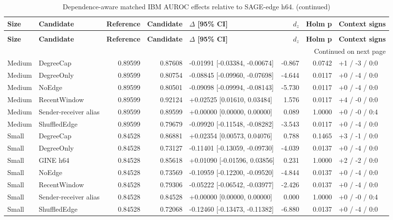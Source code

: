 \begingroup
\footnotesize
\setlength{\tabcolsep}{3pt}
\renewcommand{\arraystretch}{1.10}
\begin{longtable}{@{}p{} p{} r r p{} r r p{}@{}}
\caption{Dependence-aware matched IBM AUROC effects relative to SAGE-edge h64.}\label{tab:s-ibm-effect-auroc}\\
\toprule
\textbf{Size} & \textbf{Candidate} & \textbf{Reference} & \textbf{Candidate} & \textbf{$\Delta$ [95\% CI]} & \textbf{$d_z$} & \textbf{Holm p} & \textbf{Context signs} \\
\midrule
\endfirsthead
\caption[]{Dependence-aware matched IBM AUROC effects relative to SAGE-edge h64. (continued)}\\
\toprule
\textbf{Size} & \textbf{Candidate} & \textbf{Reference} & \textbf{Candidate} & \textbf{$\Delta$ [95\% CI]} & \textbf{$d_z$} & \textbf{Holm p} & \textbf{Context signs} \\
\midrule
\endhead
\midrule
\multicolumn{8}{r}{\footnotesize Continued on next page}\\
\endfoot
\bottomrule
\endlastfoot
Medium & DegreeCap & 0.89599 & 0.87608 & -0.01991 [-0.03384, -0.00674] & -0.867 & 0.0742 & +1 / -3 / 0:0 \\
Medium & DegreeOnly & 0.89599 & 0.80754 & -0.08845 [-0.09960, -0.07698] & -4.644 & 0.0117 & +0 / -4 / 0:0 \\
Medium & NoEdge & 0.89599 & 0.80501 & -0.09098 [-0.09994, -0.08143] & -5.730 & 0.0117 & +0 / -4 / 0:0 \\
Medium & RecentWindow & 0.89599 & 0.92124 & +0.02525 [0.01610, 0.03484] & 1.576 & 0.0117 & +4 / -0 / 0:0 \\
Medium & Sender-receiver alias & 0.89599 & 0.89599 & +0.00000 [0.00000, 0.00000] & 0.089 & 1.0000 & +0 / -0 / 0:4 \\
Medium & ShuffledEdge & 0.89599 & 0.79679 & -0.09920 [-0.11548, -0.08282] & -3.543 & 0.0117 & +0 / -4 / 0:0 \\
Small & DegreeCap & 0.84528 & 0.86881 & +0.02354 [0.00573, 0.04076] & 0.788 & 0.1465 & +3 / -1 / 0:0 \\
Small & DegreeOnly & 0.84528 & 0.73127 & -0.11401 [-0.13059, -0.09730] & -4.039 & 0.0137 & +0 / -4 / 0:0 \\
Small & GINE h64 & 0.84528 & 0.85618 & +0.01090 [-0.01596, 0.03856] & 0.231 & 1.0000 & +2 / -2 / 0:0 \\
Small & NoEdge & 0.84528 & 0.73569 & -0.10959 [-0.12200, -0.09520] & -4.844 & 0.0137 & +0 / -4 / 0:0 \\
Small & RecentWindow & 0.84528 & 0.79306 & -0.05222 [-0.06542, -0.03977] & -2.426 & 0.0137 & +0 / -4 / 0:0 \\
Small & Sender-receiver alias & 0.84528 & 0.84528 & +0.00000 [0.00000, 0.00000] & 0.000 & 1.0000 & +0 / -0 / 0:4 \\
Small & ShuffledEdge & 0.84528 & 0.72068 & -0.12460 [-0.13473, -0.11382] & -6.880 & 0.0137 & +0 / -4 / 0:0 \\
\end{longtable}
